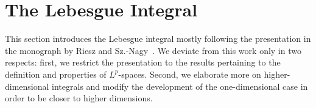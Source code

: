 
\section{The Lebesgue Integral}
\label{sec:lebesgue-integral}
\begin{intro}
  This section introduces the Lebesgue integral mostly following the
  presentation in the monograph by Riesz and
  Sz.-Nagy~\cite{RieszNagy}. We deviate from this work only in two
  respects: first, we restrict the presentation to the results
  pertaining to the definition and properties of $L^p$-spaces. Second,
  we elaborate more on higher-dimensional integrals and modify the
  development of the one-dimensional case in order to be closer to
  higher dimensions.
\end{intro}


